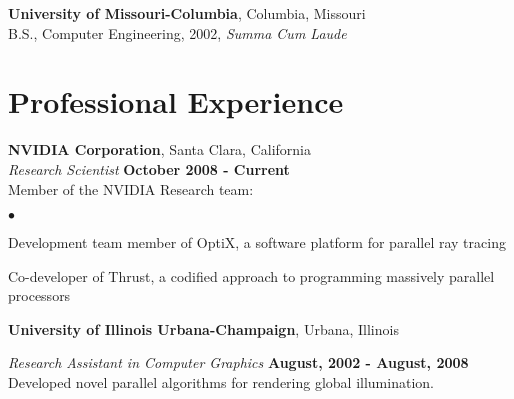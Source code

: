 \documentclass[margin,line]{res}
\newenvironment{list1}{
  \begin{list}{\ding{113}}{%
      \setlength{\itemsep}{0in}
      \setlength{\parsep}{0in} \setlength{\parskip}{0in}
      \setlength{\topsep}{0in} \setlength{\partopsep}{0in}
      \setlength{\leftmargin}{0.17in}}}{\end{list}}
\newenvironment{list2}{
  \begin{list}{$\bullet$}{%
      \setlength{\itemsep}{0in}
      \setlength{\parsep}{0in} \setlength{\parskip}{0in}
      \setlength{\topsep}{0in} \setlength{\partopsep}{0in}
      \setlength{\leftmargin}{0.2in}}}{\end{list}}
\begin{document}
\begin{resume}

{\bf University of Missouri-Columbia}, Columbia, Missouri\\
B.S., Computer Engineering, 2002, \em Summa Cum Laude\em

\section{\sc Professional Experience}
{\bf NVIDIA Corporation}, Santa Clara, California\\
{\em Research Scientist} \hfill {\bf October 2008 - Current}\\
Member of the NVIDIA Research team: \vspace*{.05in}
\begin{list2}
\item Development team member of OptiX, a software platform for parallel ray tracing
\item Co-developer of Thrust, a codified approach to programming massively parallel processors
\end{list2}

{\bf University of Illinois Urbana-Champaign}, Urbana, Illinois

\vspace{-.3cm}
{\em Research Assistant in Computer Graphics} \hfill {\bf August, 2002 - August, 2008}\\
Developed novel parallel algorithms for rendering global illumination.


\end{resume}
\end{document}
